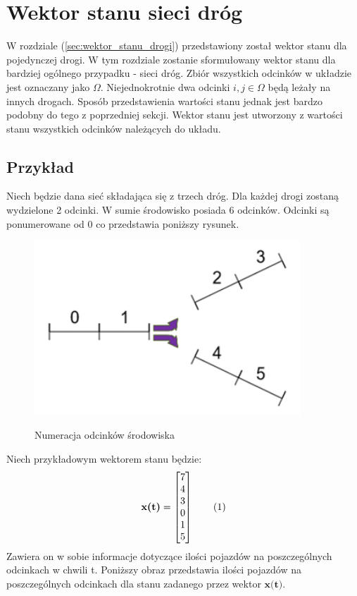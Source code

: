 \documentclass[12pt]{book}
\theoremstyle{plain}
\newcommand\addtag{\refstepcounter{equation}
\renewcommand{\labelenumii}{\theenumii}
\renewcommand{\theenumii}{\theenumi.\arabic{enumii}.}
\tag{\theequation}}
\begin{document}
\section {Wektor stanu sieci dróg}
W rozdziale (\ref{sec:wektor_stanu_drogi}) przedstawiony został wektor stanu dla pojedynczej drogi. W tym rozdziale zostanie sformułowany wektor stanu dla bardziej ogólnego przypadku - sieci dróg. Zbiór wszystkich odcinków w układzie jest oznaczany jako $\Omega$. Niejednokrotnie dwa odcinki $i,j \in \Omega$ będą leżały na innych drogach. Sposób przedstawienia wartości stanu jednak jest bardzo podobny do tego z poprzedniej sekcji. Wektor stanu jest utworzony z wartości stanu wszystkich odcinków należących do układu.
\subsection*{Przykład} \label{subsec:wektor_stanu_siec_przyklad}
Niech będzie dana sieć składająca się z trzech dróg. Dla każdej drogi zostaną wydzielone 2 odcinki. W sumie środowisko posiada 6 odcinków. Odcinki są ponumerowane od 0 co przedstawia poniższy rysunek.
\def \xzero {\begin{bmatrix}
		7 \\ 4 \\ 3 \\ 0 \\ 1 \\ 5
\end{bmatrix}}
	\begin{figure}[H]
	\centering
	\includegraphics[width=10cm]{images/env_11}
	\label{fig:env_11}
	\caption{Numeracja odcinków środowiska}
\end{figure}Niech przykładowym wektorem stanu będzie:
\[\textbf{x(t)}=\xzero \addtag \]
Zawiera on w sobie informacje dotyczące ilości pojazdów na poszczególnych odcinkach w chwili t. Poniższy obraz przedstawia ilości pojazdów na poszczególnych odcinkach dla stanu zadanego przez wektor $\textbf{x(t)}$.
\end{document}

